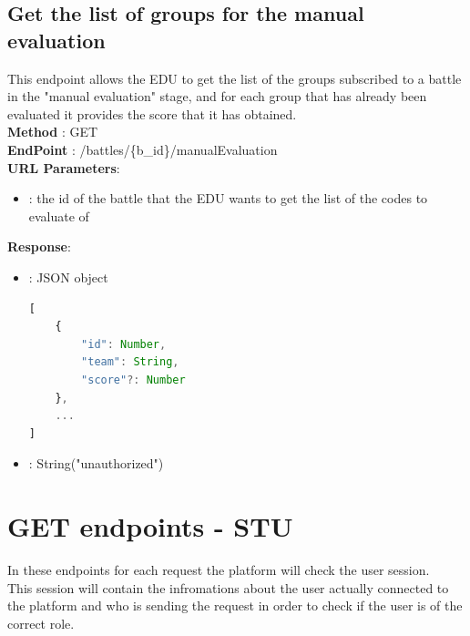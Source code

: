 \subsection*{Get the list of groups for the manual evaluation}
This endpoint allows the EDU to get the list of the groups subscribed to a battle in the "manual evaluation" stage, and for each group that has already been evaluated it provides the score that it has obtained.\\
\textbf{Method} : GET \\
\textbf{EndPoint} : /battles/\{b\_id\}/manualEvaluation \\
\textbf{URL Parameters}:
\begin{itemize}
    \item {} : the id of the battle that the EDU wants to get the list of the codes to evaluate of
\end{itemize}
\textbf{Response}:
\begin{itemize}
    \item {} : JSON object
          \begin{lstlisting}[language=JavaScript, label={lst:jscode}, basicstyle=\ttfamily]
[
    {
        "id": Number,
        "team": String,
        "score"?: Number
    },
    ...
]
        \end{lstlisting}
    \item {} : String("unauthorized")
\end{itemize}

\section*{GET endpoints - STU}
In these endpoints for each request the platform will check the user session.\\
This session will contain the infromations about the user actually connected to the platform and who is sending the request in order to check if the user is of the correct role.

